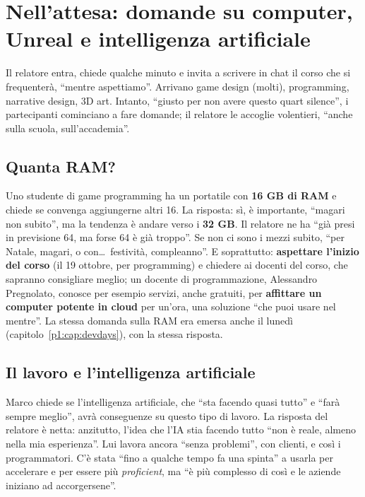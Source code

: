 \section{Nell'attesa: domande su computer, Unreal e intelligenza
artificiale}
\label{p0:sec:attesa}

Il relatore entra, chiede qualche minuto e invita a scrivere in chat il
corso che si frequenterà, ``mentre aspettiamo''. Arrivano game design
(molti), programming, narrative design, 3D art. Intanto, ``giusto per non
avere questo quart silence'', i partecipanti cominciano a fare domande;
il relatore le accoglie volentieri, ``anche sulla scuola, sull'accademia''.

\subsection{Quanta RAM?}

Uno studente di game programming ha un portatile con \textbf{16 GB di RAM}
e chiede se convenga aggiungerne altri 16. La risposta: sì, è importante,
``magari non subito'', ma la tendenza è andare verso i \textbf{32 GB}. Il
relatore ne ha ``già presi in previsione 64, ma forse 64 è già troppo''.
Se non ci sono i mezzi subito, ``per Natale, magari, o con\ldots\
festività, compleanno''. E soprattutto: \textbf{aspettare l'inizio del
corso} (il 19 ottobre, per programming) e chiedere ai docenti del corso,
che sapranno consigliare meglio; un docente di programmazione, Alessandro
Pregnolato, conosce per esempio servizi, anche gratuiti, per
\textbf{affittare un computer potente in cloud} per un'ora, una soluzione
``che puoi usare nel mentre''. La stessa domanda sulla RAM era emersa anche
il lunedì (capitolo~\ref{p1:cap:devdays}), con la stessa risposta.

\subsection{Il lavoro e l'intelligenza artificiale}

Marco chiede se l'intelligenza artificiale, che ``sta facendo quasi
tutto'' e ``farà sempre meglio'', avrà conseguenze su questo tipo di lavoro.
La risposta del relatore è netta: anzitutto, l'idea che l'IA stia facendo
tutto ``non è reale, almeno nella mia esperienza''. Lui lavora ancora
``senza problemi'', con clienti, e così i programmatori. C'è stata ``fino a
qualche tempo fa una spinta'' a usarla per accelerare e per essere più
\emph{proficient}, ma ``è più complesso di così e le aziende iniziano ad
accorgersene''.

